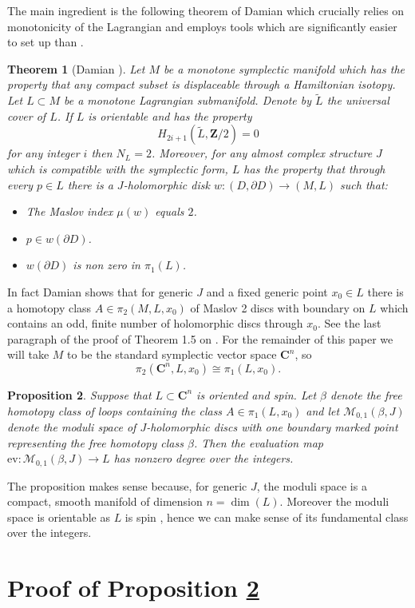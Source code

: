 \documentclass{amsart}
\newcommand{\mM}{\mathcal{M}}
\newcommand{\CC}{\mathbf{C}}
\newcommand{\ZZ}{\mathbf{Z}}
\newcommand{\ev}{\mathrm{ev}}
\newtheorem{thm}{Theorem}
\newtheorem{prp}[thm]{Proposition}
\begin{document}
The main ingredient is the following theorem of Damian which crucially relies on monotonicity of the Lagrangian and employs tools which are significantly easier to set up than \cite{Fuk}.
\begin{thm}[Damian {\cite[Theorem 1.5(b)-(c)]{Dam}}]
Let $M$ be a monotone symplectic manifold which has the property that any compact subset is displaceable through a Hamiltonian isotopy. Let $L\subset M$ be a monotone Lagrangian submanifold. Denote by $\tilde{L}$ the universal cover of $L$. If $L$ is orientable and has the property
\[H_{2i+1}(\tilde{L},\ZZ/2)=0\]
for any integer $i$ then $N_L=2$. Moreover, for any almost complex structure $J$ which is compatible with the symplectic form, $L$ has the property that through every $p\in L$ there is a $J$-holomorphic disk $w\colon(D,\partial D)\to(M, L)$ such that:
\begin{itemize}
\item The Maslov index $\mu(w)$ equals $2$.
\item $p\in w(\partial D)$.
\item $w(\partial D)$ is non zero in $\pi_1(L)$.
\end{itemize}
\end{thm}
In fact Damian shows that for generic $J$ and a fixed generic point $x_0\in L$ there is a homotopy class $A\in\pi_2(M,L,x_0)$ of Maslov 2 discs with boundary on $L$ which contains an odd, finite number of holomorphic discs through $x_0$. See the last paragraph of the proof of Theorem 1.5 on {\cite[Page 453]{Dam}}. For the remainder of this paper we will take $M$ to be the standard symplectic vector space $\CC^n$, so
\[\pi_2(\CC^n,L,x_0)\cong\pi_1(L,x_0).\]
\begin{prp}\label{degree}
Suppose that $L\subset\CC^n$ is oriented and spin. Let $\beta$ denote the free homotopy class of loops containing the class $A\in\pi_1(L,x_0)$ and let $\mM_{0,1}(\beta,J)$ denote the moduli space of $J$-holomorphic discs with one boundary marked point representing the free homotopy class $\beta$. Then the evaluation map $\ev\colon\mM_{0,1}(\beta,J)\to L$ has nonzero degree over the integers.
\end{prp}
The proposition makes sense because, for generic $J$, the moduli space is a compact, smooth manifold of dimension $n=\dim(L)$. Moreover the moduli space is orientable as $L$ is spin \cite{FOOO}, hence we can make sense of its fundamental class over the integers.

\section{Proof of Proposition \ref{degree}}\label{topology}
\end{document}
